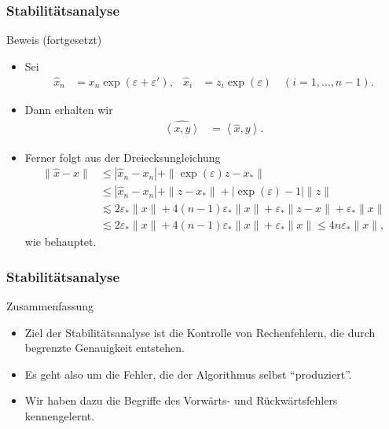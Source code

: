 \documentclass{beamer}
\newcommand{\eps}{\varepsilon}
\newcommand{\bck}[1]{\left\langle{#1}\right\rangle}
\newcommand\scal[2]{\bck{{#1},{#2}}}
\renewcommand{\ae}{\"a}
\newcommand{\ue}{\"u}
\newcommand{\mytitle}{Stabilit\ae tsanalyse}
\begin{document}
\begin{frame}\frametitle{\mytitle}
	\begin{block}{Beweis (fortgesetzt)}
		\begin{itemize}
			\item Sei
				\begin{align*}
					\hat x_n&=x_n\exp(\eps+\eps'),&\hat x_i&=z_i\exp(\eps)\quad(i=1,\ldots,n-1).
				\end{align*}
			\item Dann erhalten wir
				\begin{align*}
					\widehat{\scal xy}&=\scal{\hat x}y.
				\end{align*}
			\item 
				Ferner folgt aus der Dreiecksungleichung
				\begin{align*}
					\|\hat x-x\|&\leq|\hat x_n-x_n|+\|\exp(\eps)z-x_*\|\\&\leq|\hat x_n-x_n|+\|z-x_*\|+|\exp(\eps)-1|\|z\|\\
								&\lesssim2\eps_*\|x\|+4(n-1)\eps_*\|x\|+\eps_*\|z-x\|+\eps_*\|x\|\\
								&\lesssim2\eps_*\|x\|+4(n-1)\eps_*\|x\|+\eps_*\|x\|\leq4n\eps_*\|x\|,
				\end{align*}
				wie behauptet.
		\end{itemize}
	\end{block}
\end{frame}

\begin{frame}\frametitle{\mytitle}
	\begin{block}{Zusammenfassung}
		\begin{itemize}
			\item Ziel der Stabilit\ae tsanalyse ist die Kontrolle von Rechenfehlern, die durch begrenzte Genauigkeit entstehen.
			\item Es geht also um die Fehler, die der Algorithmus selbst ``produziert''.
			\item Wir haben dazu die Begriffe des Vorw\ae rts- und R\ue ckw\ae rtsfehlers kennengelernt.
		\end{itemize}
	\end{block}
\end{frame}
\end{document}
